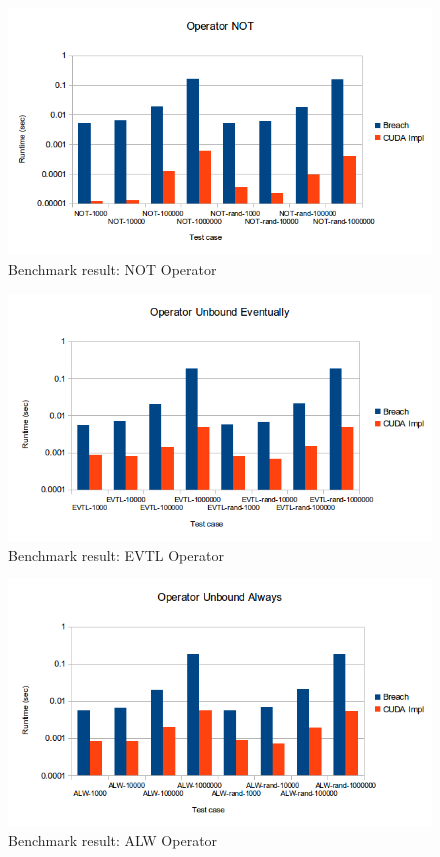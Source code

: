 \documentclass[a4paper,10pt]{article}
\begin{document}
\begin{figure}[H]
    \includegraphics[scale=0.5]{bm_not.png}
    \caption{
        \label{fig:bm_not}
        Benchmark result: NOT Operator}
\end{figure}

\begin{figure}[H]
    \includegraphics[scale=0.5]{bm_evtl.png}
    \caption{
        \label{fig:bm_evtl}
        Benchmark result: EVTL Operator}
\end{figure}

\begin{figure}[H]
    \includegraphics[scale=0.5]{bm_alw.png}
    \caption{
        \label{fig:bm_alw}
        Benchmark result: ALW Operator}
\end{figure}
\end{document}

